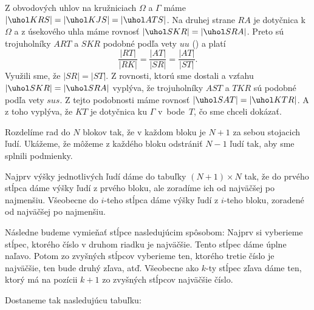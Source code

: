 {%
Z obvodových uhlov na kružniciach $\Omega$ a $\Gamma$ máme  $|\uhol KRS|=|\uhol KJS|=|\uhol ATS|$. Na druhej strane $RA$ je dotyčnica k $\Omega$ a z úsekového uhla máme rovnosť $|\uhol SKR|=|\uhol SRA|$. Preto sú trojuholníky $ART$ a $SKR$ podobné podľa vety $uu$ (\obr) a platí $$\frac{|RT|}{|RK|}=\frac{|AT|}{|SR|}=\frac{|AT|}{|ST|}.$$
Využili sme, že $|SR|=|ST|$. Z rovnosti, ktorú sme dostali a vzťahu $|\uhol SKR|=|\uhol SRA|$ vyplýva, že trojuholníky $AST$ a $TKR$ sú podobné podľa vety $sus$. Z tejto podobnosti máme rovnosť $|\uhol SAT|=|\uhol KTR|$. A z toho vyplýva, že $KT$ je dotyčnica ku $\Gamma$ v~bode~$T$, čo sme chceli dokázať.%
}

{%
Rozdelíme rad do $N$ blokov tak, že v každom bloku je $N+1$ za sebou stojacich ľudí. Ukážeme, že môžeme z každého bloku odstrániť $N-1$ ľudí tak, aby sme splnili podmienky.

Najprv výšky jednotlivých ľudí dáme do tabuľky $(N+1)\times N$ tak, že do prvého stĺpca dáme výšky ľudí z prvého bloku, ale zoradíme ich od najväčšej po najmenšiu. Všeobecne do $i$-teho stĺpca dáme výšky ľudí z $i$-teho bloku, zoradené od najväčšej po najmenšiu.

Následne budeme vymieňať stĺpce nasledujúcim spôsobom: Najprv si vyberieme stĺpec, ktorého číslo v druhom riadku je najväčšie. Tento stĺpec dáme úplne naľavo. Potom zo zvyšných stĺpcov vyberieme ten, ktorého tretie číslo je najväčšie, ten bude druhý zľava, atď. Všeobecne ako $k$-ty stĺpec zľava dáme ten, ktorý má na pozícii $k+1$ zo zvyšných stĺpcov najväčšie číslo.

Dostaneme tak nasledujúcu tabuľku:

}
